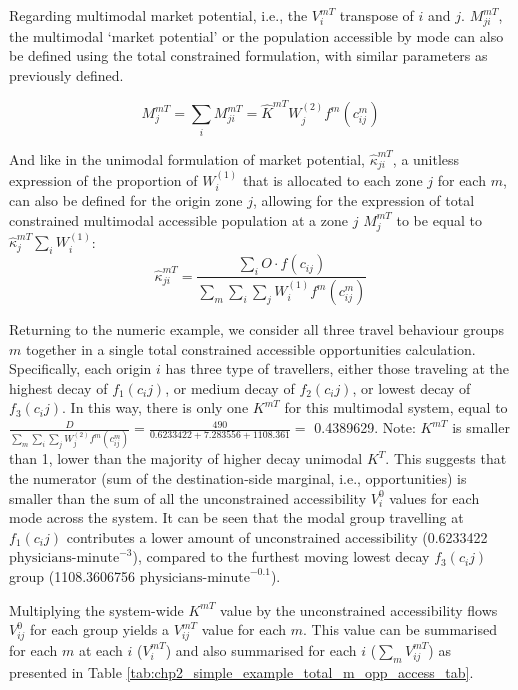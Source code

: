 \documentclass[
11pt, %
oneside, %
english, %
singlespacing, %
]{macthesis} %
\begin{document}
Regarding multimodal market potential, i.e., the \(V_i^{mT}\) transpose of \(i\) and \(j\). \(M^{mT}_{ji}\), the multimodal `market potential' or the population accessible by mode can also be defined using the total constrained formulation, with similar parameters as previously defined.

\begin{equation}
\label{eq:total-constrained-multimodal-market}
M^{mT}_{j} = \sum_i M^{mT}_{ji} = \hat K^{mT} W_j^{(2)} f^m(c^m_{ij})
\end{equation} 

And like in the unimodal formulation of market potential, \(\hat \kappa_{ji}^{mT}\), a unitless expression of the proportion of \(W^{(1)}_i\) that is allocated to each zone \(j\) for each \(m\), can also be defined for the origin zone \(j\), allowing for the expression of total constrained multimodal accessible population at a zone \(j\) \(M^{mT}_j\) to be equal to \(\hat \kappa_j^{mT}\sum_i W^{(1)}_i\):
\[
\hat \kappa_{ji}^{mT} = \frac{\sum_i O \cdot f(c_{ij})}{\sum_m\sum_i\sum_j W^{(1)}_if^m(c^m_{ij})}
\]

Returning to the numeric example, we consider all three travel behaviour groups \(m\) together in a single total constrained accessible opportunities calculation. Specifically, each origin \(i\) has three type of travellers, either those traveling at the highest decay of \(f_1 (c_ij)\), or medium decay of \(f_2(c_ij)\), or lowest decay of \(f_3(c_ij)\). In this way, there is only one \(K^{mT}\) for this multimodal system, equal to \(\frac{D}{\sum_m\sum_i\sum_j W^{(2)}_jf^m(c^m_{ij})} = \frac{490}{0.6233422 + 7.283556 + 1108.361}=\) 0.4389629. Note: \(K^{mT}\) is smaller than 1, lower than the majority of higher decay unimodal \(K^T\). This suggests that the numerator (sum of the destination-side marginal, i.e., opportunities) is smaller than the sum of all the unconstrained accessibility \(V^{0}_i\) values for each mode across the system. It can be seen that the modal group travelling at \(f_1 (c_ij)\) contributes a lower amount of unconstrained accessibility (0.6233422 \(\text{physicians-minute}^{-3}\)), compared to the furthest moving lowest decay \(f_3(c_ij)\) group (1108.3606756 \(\text{physicians-minute}^{-0.1}\)).

Multiplying the system-wide \(K^{mT}\) value by the unconstrained accessibility flows \(V^{0}_{ij}\) for each group yields a \(V^{mT}_{ij}\) value for each \(m\). This value can be summarised for each \(m\) at each \(i\) (\(V^{mT}_{i}\)) and also summarised for each \(i\) (\(\sum_m V^{mT}_{ij}\)) as presented in Table \ref{tab:chp2_simple_example_total_m_opp_access_tab}.
\end{document}
